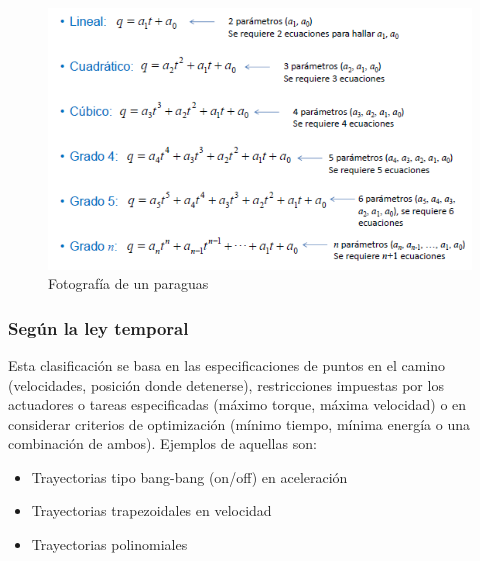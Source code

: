         \begin{figure}[htb]
            \centering
            \includegraphics[width=1\linewidth]{Main/Chapter4/Images4/cap4_tray_5.png}
            \caption{Fotografía de un paraguas}
            \label{f:Cap4_tray_5}
        \end{figure}              
            
        \newpage   

        
        \subsubsection{Según la ley temporal }
            Esta clasificación se basa en las especificaciones de puntos en el camino (velocidades, posición donde detenerse), restricciones impuestas por los actuadores o tareas especificadas (máximo torque, máxima velocidad) o en considerar criterios de optimización (mínimo tiempo, mínima energía o una combinación de ambos).  Ejemplos de aquellas son:
            \begin{itemize}
                \item   Trayectorias tipo bang-bang (on/off) en aceleración
                \item   Trayectorias trapezoidales en velocidad
                \item   Trayectorias polinomiales
            \end{itemize}
            

